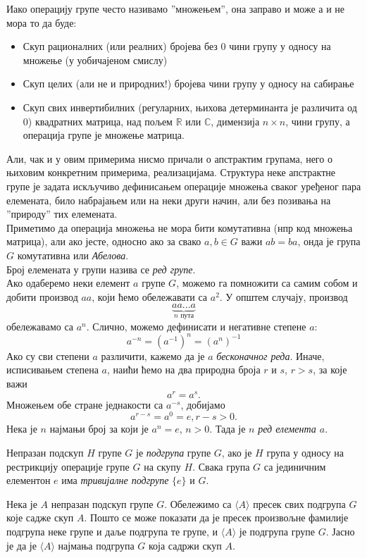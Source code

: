 \documentclass{report}
\theoremstyle{plain}
\theoremstyle{definition}
\begin{document}
Иако операцију групе често називамо ''множењем'', она заправо и може а и не мора то да буде:
\begin{itemize}
  \item Скуп рационалних (или реалних) бројева без $0$ чини групу у односу на множење (у уобичајеном смислу)
  \item Скуп целих (али не и природних!) бројева чини групу у односу на сабирање
  \item Скуп свих инвертибилних (регуларних, њихова детерминанта је различита од $0$) квадратних матрица, над пољем $\mathbb{R}$ или $\mathbb{C}$, димензија $n\times n$, чини групу, а операција групе је множење матрица.
\end{itemize}
Али, чак и у овим примерима нисмо причали о апстрактим групама, него о њиховим конкретним примерима, реализацијама. Структура неке апстрактне групе је задата искључиво дефинисањем операције множења сваког уређеног пара елемената, било набрајањем или на неки други начин, али без позивања на ''природу'' тих елемената.\\
Приметимо да операција множења не мора бити комутативна (нпр код множења матрица), али ако јесте, односно ако за свако $a, b\in G$ важи $ab = ba$, онда је група $G$ комутативна или \emph{Абелова}.\\
Број елемената у групи назива се \emph{ред групе}.\\
Ако одаберемо неки елемент $a$ групе $G$, можемо га помножити са самим собом и добити производ $aa$, који ћемо обележавати са $a^2$. У општем случају, производ $$\underbrace{aa...a}_{n\text{ пута}}$$ обележавамо са $a^n$. Слично, можемо дефинисати и негативне степене $a$:
$$a^{-n} = (a^{-1})^n = (a^n)^{-1}$$
Ако су сви степени $a$ различити, кажемо да је $a$ \emph{бесконачног реда}. Иначе, исписивањем степена $a$, наићи ћемо на два природна броја $r$ и $s$, $r>s$, за које важи
$$a^r = a^s.$$
Множењем обе стране једнакости са $a^{-s}$, добијамо
$$a^{r-s} = a^0 = e, r-s>0.$$
Нека је $n$ најмањи број за који је $a^n = e$, $n>0$. Тада је $n$ \emph{ред елемента $a$}.

Непразан подскуп $H$ групе $G$ је \emph{подгрупа} групе $G$, ако је $H$ група у односу на рестрикцију операције групе $G$ на скупу $H$. Свака група $G$ са јединичним елементон $e$ има \emph{тривијалне подгрупе} $\{e\}$ и $G$.

Нека је $A$ непразан подскуп групе $G$. Обележимо са $\langle A\rangle$ пресек свих подгрупа $G$ које садже скуп $A$. Пошто се може показати да је пресек произвољне фамилије подгрупа неке групе и даље подгрупа те групе, и $\langle A\rangle$ је подгрупа групе $G$. Јасно је да је $\langle A\rangle$ најмања подгрупа $G$ која садржи скуп $A$.
\end{document}

